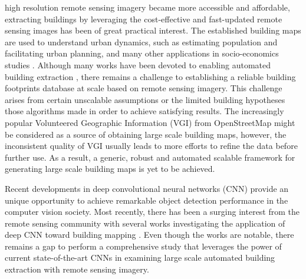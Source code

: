 \documentclass[journal]{IEEEtran}
\begin{document}
 high resolution remote sensing imagery became more accessible and affordable, extracting buildings by leveraging the cost-effective and fast-updated remote sensing images has been of great practical interest. The established building maps are used to understand urban dynamics, such as estimating population and facilitating urban planning, and many other applications in socio-economics studies \cite{JensenCowen1999}. Although many works have been devoted to enabling automated building extraction \cite{Ok2013a,Ngo2017,Li2015,Kim1999,Hermosilla2011}, there remains a challenge to establishing a reliable building footprints database at scale based on remote sensing imagery. This challenge arises from certain unscalable assumptions or the limited building hypotheses those algorithms made in order to achieve satisfying results. The increasingly popular Volunteered Geographic Information (VGI) from OpenStreetMap \cite{HaklayWeber2008} might be considered as a source of obtaining large scale building maps, however, the inconsistent quality of VGI usually leads to more efforts to refine the data before further use. As a result, a generic, robust and automated scalable framework for generating large scale building maps is yet to be  achieved.

Recent developments in deep convolutional neural networks (CNN) provide an unique opportunity to achieve remarkable object detection performance in the computer vision society. Most recently, there has been a surging interest from the remote sensing community with several works investigating the application of deep CNN toward building mapping \cite{PaisitkriangkraiSherrahJanneyEtAl2016, Yuan2018, Bittner2017481, 7729471,Lunga2018}. Even though the works are notable, there remains a gap to perform a comprehensive study that leverages the power of current state-of-the-art CNNs in examining large scale automated building extraction with remote sensing imagery. 
\end{document}
